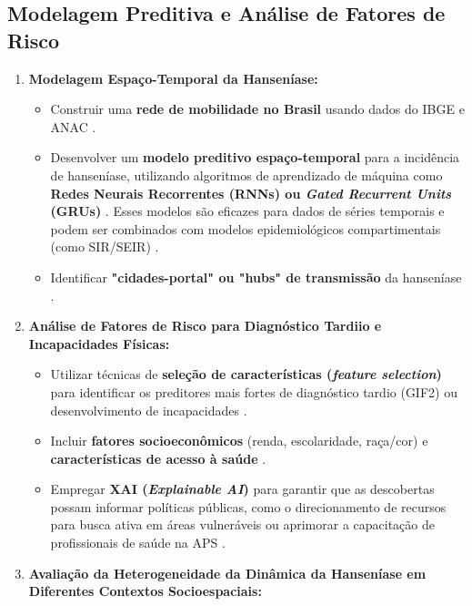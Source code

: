 \documentclass{article}
\begin{document}
\subsection{Modelagem Preditiva e Análise de Fatores de Risco}
\begin{enumerate}
    \item \textbf{Modelagem Espaço-Temporal da Hanseníase:}
    \begin{itemize}
        \item Construir uma \textbf{rede de mobilidade no Brasil} usando dados do IBGE e ANAC \cite{oliveira2024human, inovacao_computacional_hanseniase}.
        \item Desenvolver um \textbf{modelo preditivo espaço-temporal} para a incidência de hanseníase, utilizando algoritmos de aprendizado de máquina como \textbf{Redes Neurais Recorrentes (RNNs) ou \textit{Gated Recurrent Units} (GRUs)} \cite{inovacao_computacional_hanseniase, messier_gru_preprocessing}. Esses modelos são eficazes para dados de séries temporais e podem ser combinados com modelos epidemiológicos compartimentais (como SIR/SEIR) \cite{inovacao_computacional_hanseniase, silva2022machine}.
        \item Identificar \textbf{"cidades-portal" ou "hubs" de transmissão} da hanseníase \cite{inovacao_computacional_hanseniase}.
    \end{itemize}
    \item \textbf{Análise de Fatores de Risco para Diagnóstico Tardiio e Incapacidades Físicas:}
    \begin{itemize}
        \item Utilizar técnicas de \textbf{seleção de características (\textit{feature selection})} para identificar os preditores mais fortes de diagnóstico tardio (GIF2) ou desenvolvimento de incapacidades \cite{bigdata_review, inovacao_computacional_hanseniase}.
        \item Incluir \textbf{fatores socioeconômicos} (renda, escolaridade, raça/cor) e \textbf{características de acesso à saúde} \cite{inovacao_computacional_hanseniase, saldanha2021ciencia}.
        \item Empregar \textbf{XAI (\textit{Explainable AI})} para garantir que as descobertas possam informar políticas públicas, como o direcionamento de recursos para busca ativa em áreas vulneráveis ou aprimorar a capacitação de profissionais de saúde na APS \cite{bigdata_review, inovacao_computacional_hanseniase}.
    \end{itemize}
    \item \textbf{Avaliação da Heterogeneidade da Dinâmica da Hanseníase em Diferentes Contextos Socioespaciais:}

\end{enumerate}
\end{document}
